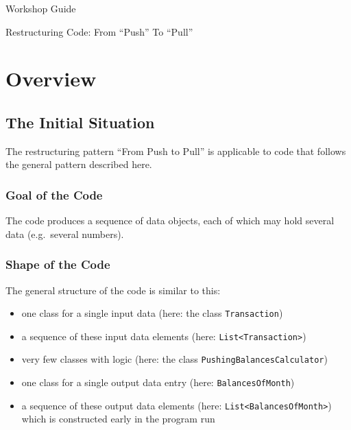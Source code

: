 \documentclass[a4paper,fleqn,titlepage,11pt]{article}
\begin{document}
\thispagestyle{empty}

\begin{center}
\LARGE
Workshop Guide

\vspace{1cm}

Restructuring Code: From ``Push''  To ``Pull''
\end{center}

\normalsize

\vspace{0.6cm}


\section*{Overview}

\subsection*{The Initial Situation}

The restructuring pattern ``From Push to Pull'' is applicable to code that follows the general pattern described here.

\subsubsection*{Goal of the Code}

The code produces a sequence of data objects, each of which may hold several data (e.g.~several numbers).

\subsubsection*{Shape of the Code}

The general structure of the code is similar to this:

\begin{itemize}
\item one class for a single input data (here: the class \texttt{Transaction})
\item a sequence of these input data elements (here: \texttt{List<Transaction>})
\item very few classes with logic (here: the class \texttt{PushingBalancesCalculator})
\item one class for a single output data entry (here: \texttt{BalancesOfMonth})
\item a sequence of these output data elements (here: \texttt{List<BalancesOfMonth>}) which is constructed early in the program run
\end{itemize}
\end{document}

